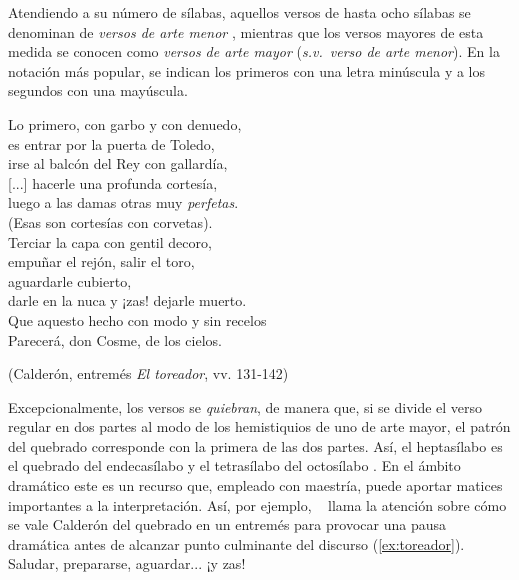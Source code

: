 Atendiendo a su número de sílabas, aquellos versos de hasta ocho sílabas se denominan de \textit{versos de arte menor}  \parencite[\textit{s.v.} \textit{verso de arte menor}]{dominguez1985}, mientras que los versos mayores de esta medida se conocen como \textit{versos de arte mayor} (\textit{s.v.}~\textit{verso de arte menor}). En la notación más popular, se indican los primeros con una letra minúscula y a los segundos con una mayúscula.

\begin{exe}
	\ex\label{ex:toreador}
Lo primero, con garbo y con denuedo,\\
es entrar por la puerta de Toledo,\\
irse al balcón del Rey con gallardía,\\
{[...]} hacerle una profunda cortesía,\\
luego a las damas otras muy \textit{perfetas}.\\
(Esas son cortesías con corvetas).\\
Terciar la capa con gentil decoro,\\
empuñar el rejón, salir el toro,\\
aguardarle cubierto,\\
darle en la nuca y ¡zas! dejarle muerto.\\
Que aquesto hecho con modo y sin recelos\\
Parecerá, don Cosme, de los cielos.\\
\strut\hfill(Calderón, entremés \textit{El toreador}\nocite{calderon_toreador}, vv. 131-142)
\end{exe}

Excepcionalmente, los versos se \textit{quiebran}, de manera que, si se divide el verso regular en dos partes al modo de los hemistiquios de uno de arte mayor, el patrón del quebrado corresponde con la primera de las dos partes. Así, el heptasílabo es el quebrado del endecasílabo y el tetrasílabo del octosílabo \parencites[178-180]{diazrengifo2012}[\textit{s.v.} \textit{quebrado}]{dominguez1985}. En el ámbito dramático este es un recurso que, empleado con maestría, puede aportar matices importantes a la interpretación.  Así, por ejemplo, \citeauthor{hiergeist2018}~\parencite*[186]{hiergeist2018} llama la atención sobre cómo se vale Calderón del quebrado en un entremés para provocar una pausa dramática antes de alcanzar punto culminante del discurso (\ref{ex:toreador}). Saludar, prepararse, aguardar... ¡y zas!

